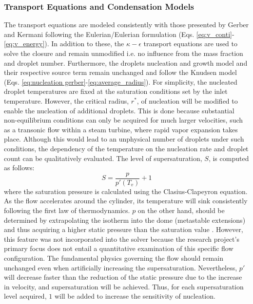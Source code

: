 \documentclass[12pt]{article}
\numberwithin{equation}{section}
\begin{document}
\subsubsection{Transport Equations and Condensation Models}\label{sss:Methodology-homogeneous-Transport} 
The transport equations are modeled consistently with those presented by Gerber and Kermani following the Eulerian/Eulerian formulation \cite{gerber2004pressure} (Eqs. \ref{eq:v_conti}-\ref{eq:v_energy}). In addition to these, the $\kappa-\epsilon$ transport equations are used to solve the closure and remain unmodified i.e. no influence from the mass fraction and droplet number. Furthermore, the droplets nucleation and growth model and their respective source term remain unchanged and follow the Knudsen model (Eqs. \ref{eq:nucleation gerber}-\ref{eq:average_radius}). For simplicity, the nucleated droplet temperatures are fixed at the saturation conditions set by the inlet temperature.  However, the critical radius, $r^*$, of nucleation will be modified to enable the nucleation of additional droplets. This is done because substantial non-equilibrium conditions can only be acquired for much larger velocities, such as a transonic flow within a steam turbine, where rapid vapor expansion takes place. Although this would lead to an unphysical number of droplets under such conditions, the dependency of the temperature on the nucleation rate and droplet count can be qualitatively evaluated. The level of supersaturation, $S$, is computed as follows:
\begin{equation}
    S=\frac{p}{p'(T_{v})}+1
\end{equation}
where the saturation pressure is calculated using the Clasius-Clapeyron equation. As the flow accelerates around the cylinder, its temperature will sink consistently following the first law of thermodynamics. $p$ on the other hand, should be determined by extrapolating the isotherm into the dome (metastable extensions) and thus acquiring a higher static pressure than the saturation value \cite{gerber2004pressure}. However, this feature was not incorporated into the solver because the research project's primary focus does not entail a quantitative examination of this specific flow configuration. The fundamental physics governing the flow should remain unchanged even when artificially increasing the supersaturation. Nevertheless, $p'$ will decrease faster than the reduction of the static pressure due to the increase in velocity, and supersaturation will be achieved. Thus, for each supersaturation level acquired, $1$ will be added to increase the sensitivity of nucleation.
\end{document}
